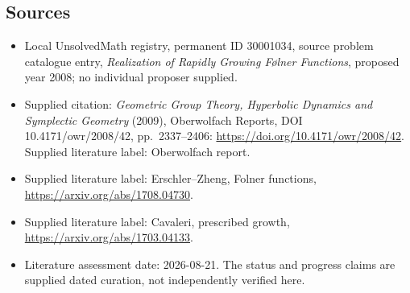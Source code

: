 \documentclass[11pt]{article}
\begin{document}
\subsection{Sources}
\begin{itemize}\item Local UnsolvedMath registry, permanent ID 30001034, source problem catalogue entry, \emph{Realization of Rapidly Growing F\o lner Functions}, proposed year 2008; no individual proposer supplied.\item Supplied citation: \emph{Geometric Group Theory, Hyperbolic Dynamics and Symplectic Geometry} (2009), Oberwolfach Reports, DOI 10.4171/owr/2008/42, pp.\ 2337--2406: \url{https://doi.org/10.4171/owr/2008/42}. Supplied literature label: Oberwolfach report.\item Supplied literature label: Erschler--Zheng, Folner functions, \url{https://arxiv.org/abs/1708.04730}.\item Supplied literature label: Cavaleri, prescribed growth, \url{https://arxiv.org/abs/1703.04133}.\item Literature assessment date: 2026-08-21. The status and progress claims are supplied dated curation, not independently verified here.\end{itemize}
\end{document}
